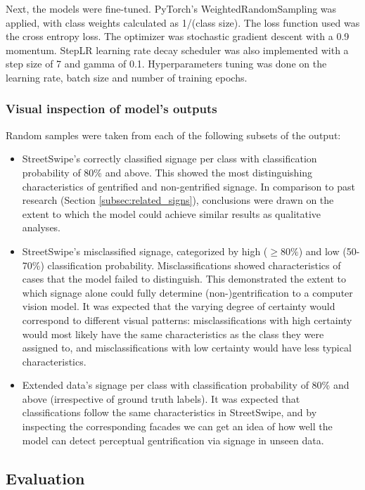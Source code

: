 Next, the models were fine-tuned. PyTorch's WeightedRandomSampling was applied, with class weights calculated as 1/(class size). The loss function used was the cross entropy loss. The optimizer was stochastic gradient descent with a 0.9 momentum. StepLR learning rate decay scheduler was also implemented with a step size of 7 and gamma of 0.1. Hyperparameters tuning was done on the learning rate, batch size and number of training epochs.

\subsubsection{Visual inspection of model's outputs}
Random samples were taken from each of the following subsets of the output:

\begin{itemize}
    \item StreetSwipe's correctly classified signage per class with classification probability of 80\% and above. This showed the most distinguishing characteristics of gentrified and non-gentrified signage. In comparison to past research (Section \ref{subsec:related_signs}), conclusions were drawn on the extent to which the model could achieve similar results as qualitative analyses.
    \item StreetSwipe's misclassified signage, categorized by high ($ \geq 80\% $) and low (50-70\%) classification probability. Misclassifications showed characteristics of cases that the model failed to distinguish. This demonstrated the extent to which signage alone could fully determine (non-)gentrification to a computer vision model. It was expected that the varying degree of certainty would correspond to different visual patterns: misclassifications with high certainty would most likely have the same characteristics as the class they were assigned to, and misclassifications with low certainty would have less typical characteristics.
    \item Extended data's signage per class with classification probability of 80\% and above (irrespective of ground truth labels). It was expected that classifications follow the same characteristics in StreetSwipe, and by inspecting the corresponding facades we can get an idea of how well the model can detect perceptual gentrification via signage in unseen data.
\end{itemize}


\subsection{Evaluation}

